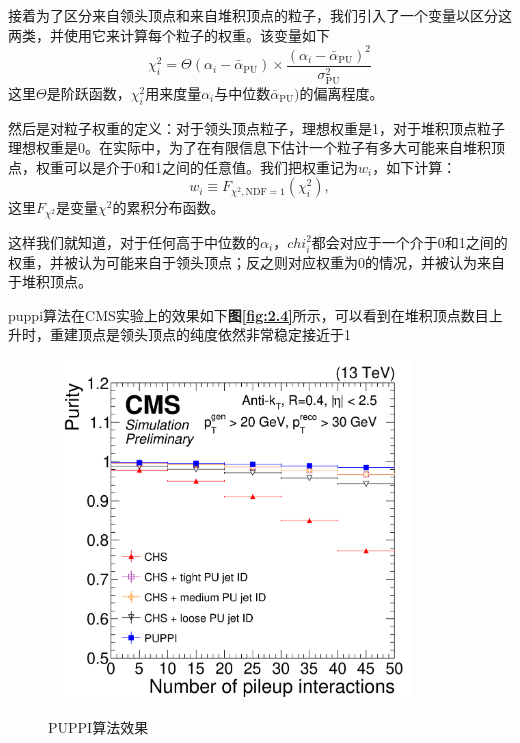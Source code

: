 接着为了区分来自领头顶点和来自堆积顶点的粒子，我们引入了一个变量以区分这两类，并使用它来计算每个粒子的权重。该变量如下
\begin{equation}\label{eq:chi2}
    \chi_{i}^{2}=\Theta(\alpha_{i}-\bar{\alpha}_{\text{PU}})\times\frac{(\alpha_{i}-\bar{\alpha}_{\text{PU}})^{2}}{\sigma_{\text{PU}}^{2}}
\end{equation}
这里$\Theta$是阶跃函数，$\chi^2_i$用来度量$\alpha_i$与中位数$\bar{\alpha}_{\text{PU}})$的偏离程度。

然后是对粒子权重的定义：对于领头顶点粒子，理想权重是1，对于堆积顶点粒子理想权重是0。在实际中，为了在有限信息下估计一个粒子有多大可能来自堆积顶点，权重可以是介于0和1之间的任意值。我们把权重记为$w_i$，如下计算：
\begin{equation}\label{eq:weight}
    w_{i}\equiv F_{\chi^{2},\text{NDF}=1}(\chi_{i}^{2}),
\end{equation}
这里$F_{\chi^2}$是变量$\chi^2$的累积分布函数。

这样我们就知道，对于任何高于中位数的$\alpha_i$，$chi^2_i$都会对应于一个介于0和1之间的权重，并被认为可能来自于领头顶点；反之则对应权重为0的情况，并被认为来自于堆积顶点。

puppi算法在CMS实验上的效果如下\textbf{图\ref{fig:2.4}}所示，可以看到在堆积顶点数目上升时，重建顶点是领头顶点的纯度依然非常稳定接近于1
\begin{figure}[H]
 \centering
 \caption{PUPPI算法效果\cite{pileup-performance}}
 \includegraphics[height=9cm, width=10cm]{pictures/puppi_performance.png}
 \label{fig:3.4}
\end{figure}

